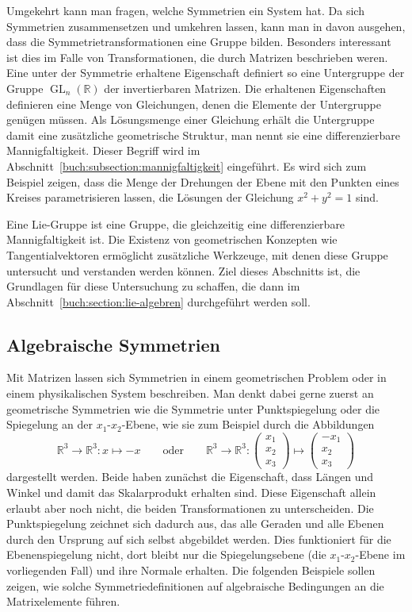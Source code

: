 Umgekehrt kann man fragen, welche Symmetrien ein System hat.
Da sich Symmetrien zusammensetzen und umkehren lassen, kann man in davon
ausgehen, dass die Symmetrietransformationen eine Gruppe bilden.
Besonders interessant ist dies im Falle von Transformationen, die
durch Matrizen beschrieben weren.
Eine unter der Symmetrie erhaltene Eigenschaft definiert so eine
Untergruppe der Gruppe $\operatorname{GL}_n(\mathbb{R})$ der
invertierbaren Matrizen.
Die erhaltenen Eigenschaften definieren eine Menge von Gleichungen,
denen die Elemente der Untergruppe genügen müssen.
Als Lösungsmenge einer Gleichung erhält die Untergruppe damit eine
zusätzliche geometrische Struktur, man nennt sie eine differenzierbare
Mannigfaltigkeit.
Dieser Begriff wird im Abschnitt~\ref{buch:subsection:mannigfaltigkeit}
eingeführt.
Es wird sich zum Beispiel zeigen, dass die Menge der Drehungen der
Ebene mit den Punkten eines Kreises parametrisieren lassen,
die Lösungen der Gleichung $x^2+y^2=1$ sind.

Eine Lie-Gruppe ist eine Gruppe, die gleichzeitig eine differenzierbare
Mannigfaltigkeit ist.
Die Existenz von geometrischen Konzepten wie Tangentialvektoren
ermöglicht zusätzliche Werkzeuge, mit denen diese Gruppe untersucht
und verstanden werden können.
Ziel dieses Abschnitts ist, die Grundlagen für diese Untersuchung zu
schaffen, die dann im Abschnitt~\ref{buch:section:lie-algebren}
durchgeführt werden soll.

\subsection{Algebraische Symmetrien
\label{buch:subsection:algebraische-symmetrien}}
Mit Matrizen lassen sich Symmetrien in einem geometrischen Problem
oder in einem physikalischen System beschreiben.
Man denkt dabei gerne zuerst an geometrische Symmetrien wie die
Symmetrie unter Punktspiegelung oder die Spiegelung an der $x_1$-$x_2$-Ebene,
wie sie zum Beispiel durch die Abbildungen
\[
\mathbb{R}^3\to\mathbb{R}^3 : x\mapsto -x
\qquad\text{oder}\qquad
\mathbb{R}^3\to\mathbb{R}^3 :
\begin{pmatrix}x_1\\x_2\\x_3\end{pmatrix}
\mapsto
\begin{pmatrix}-x_1\\x_2\\x_3\end{pmatrix}
\]
dargestellt werden.
Beide haben zunächst die Eigenschaft, dass Längen und Winkel und damit
das Skalarprodukt erhalten sind.
Diese Eigenschaft allein erlaubt aber noch nicht, die beiden Transformationen
zu unterscheiden.
Die Punktspiegelung zeichnet sich dadurch aus, das alle Geraden und alle
Ebenen durch den Ursprung auf sich selbst abgebildet werden.
Dies funktioniert für die Ebenenspiegelung nicht, dort bleibt nur die
Spiegelungsebene (die $x_1$-$x_2$-Ebene im vorliegenden Fall) und
ihre Normale erhalten.
Die folgenden Beispiele sollen zeigen, wie solche Symmetriedefinitionen
auf algebraische Bedingungen an die Matrixelemente führen.


